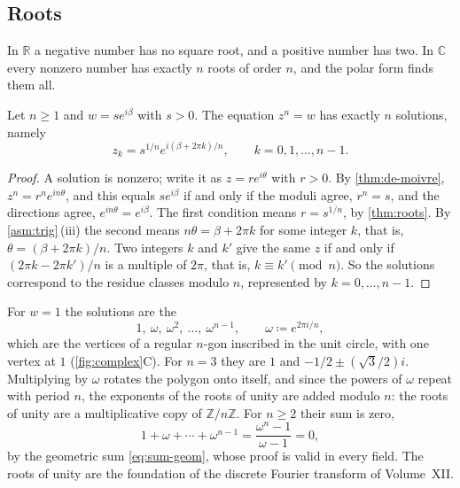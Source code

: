 \subsection{Roots}

In $\mathbb R$ a negative number has no square root, and a positive number has two. In $\mathbb C$ every nonzero number has exactly $n$ roots of order $n$, and the polar form finds them all.

\begin{theorem}
\label{thm:complex-roots}
Let $n\ge1$ and $w=se^{i\beta}$ with $s>0$. The equation $z^n=w$ has exactly $n$ solutions, namely
\[
z_k=s^{1/n}e^{i(\beta+2\pi k)/n},\qquad k=0,1,\ldots,n-1 .
\]
\end{theorem}

\begin{proof}
A solution is nonzero; write it as $z=re^{i\theta}$ with $r>0$. By \cref{thm:de-moivre}, $z^n=r^ne^{in\theta}$, and this equals $se^{i\beta}$ if and only if the moduli agree, $r^n=s$, and the directions agree, $e^{in\theta}=e^{i\beta}$. The first condition means $r=s^{1/n}$, by \cref{thm:roots}. By \cref{asm:trig}\,(iii) the second means $n\theta=\beta+2\pi k$ for some integer $k$, that is, $\theta=(\beta+2\pi k)/n$. Two integers $k$ and $k'$ give the same $z$ if and only if $(2\pi k-2\pi k')/n$ is a multiple of $2\pi$, that is, $k\equiv k'\pmod n$. So the solutions correspond to the residue classes modulo $n$, represented by $k=0,\ldots,n-1$.
\end{proof}

For $w=1$ the solutions are the 
\[
1,\ \omega,\ \omega^2,\ \ldots,\ \omega^{n-1},\qquad\omega\coloneqq e^{2\pi i/n},
\]
which are the vertices of a regular $n$-gon inscribed in the unit circle, with one vertex at $1$ (\cref{fig:complex}C). For $n=3$ they are $1$ and $-1/2\pm(\sqrt3/2)i$. Multiplying by $\omega$ rotates the polygon onto itself, and since the powers of $\omega$ repeat with period $n$, the exponents of the roots of unity are added modulo $n$: the roots of unity are a multiplicative copy of $\mathbb Z/n\mathbb Z$. For $n\ge2$ their sum is zero,
\[
1+\omega+\cdots+\omega^{n-1}=\frac{\omega^n-1}{\omega-1}=0 ,
\]
by the geometric sum \eqref{eq:sum-geom}, whose proof is valid in every field. The roots of unity are the foundation of the discrete Fourier transform of Volume~XII.

